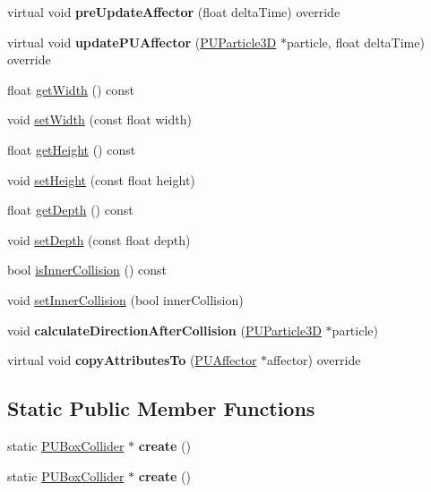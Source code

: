 \begin{DoxyCompactItemize}
virtual void {\bfseries pre\+Update\+Affector} (float delta\+Time) override
\item 
\mbox{\label{classPUBoxCollider_a1a48b1022ba2ca05121bac0b8209a24e}} 
virtual void {\bfseries update\+P\+U\+Affector} (\hyperlink{structPUParticle3D}{P\+U\+Particle3D} $\ast$particle, float delta\+Time) override
\item 
float \hyperlink{classPUBoxCollider_a6c2260632b3923ecc0eee1125b328ba4}{get\+Width} () const
\item 
void \hyperlink{classPUBoxCollider_aad771def3e9af572efaa8133fb2ab070}{set\+Width} (const float width)
\item 
float \hyperlink{classPUBoxCollider_a6377a68d34e05968b6c4eb3d085deaba}{get\+Height} () const
\item 
void \hyperlink{classPUBoxCollider_a810bf05c351a0cdf948b59e3650065c4}{set\+Height} (const float height)
\item 
float \hyperlink{classPUBoxCollider_a46d59e89fdeeccd6444135b0adda5f3c}{get\+Depth} () const
\item 
void \hyperlink{classPUBoxCollider_a932ec7d1d4a2bd823c2ce126ebb1dffe}{set\+Depth} (const float depth)
\item 
bool \hyperlink{classPUBoxCollider_ad6f759d90931e9221184688d362e5413}{is\+Inner\+Collision} () const
\item 
void \hyperlink{classPUBoxCollider_aa33fc7d0f8f816c3aed9e44355387026}{set\+Inner\+Collision} (bool inner\+Collision)
\item 
\mbox{\label{classPUBoxCollider_a861b41d3efc2a17a56387eae34ec6823}} 
void {\bfseries calculate\+Direction\+After\+Collision} (\hyperlink{structPUParticle3D}{P\+U\+Particle3D} $\ast$particle)
\item 
\mbox{\label{classPUBoxCollider_a27707e11751f6e534ed1204f146bb32b}} 
virtual void {\bfseries copy\+Attributes\+To} (\hyperlink{classPUAffector}{P\+U\+Affector} $\ast$affector) override
\end{DoxyCompactItemize}
\subsection*{Static Public Member Functions}
\begin{DoxyCompactItemize}
\item 
\mbox{\label{classPUBoxCollider_ace84d85ba4083d46178b7db3e6ee45ac}} 
static \hyperlink{classPUBoxCollider}{P\+U\+Box\+Collider} $\ast$ {\bfseries create} ()
\item 
\mbox{\label{classPUBoxCollider_a5376f99259dec78080edd61503006596}} 
static \hyperlink{classPUBoxCollider}{P\+U\+Box\+Collider} $\ast$ {\bfseries create} ()
\end{DoxyCompactItemize}
